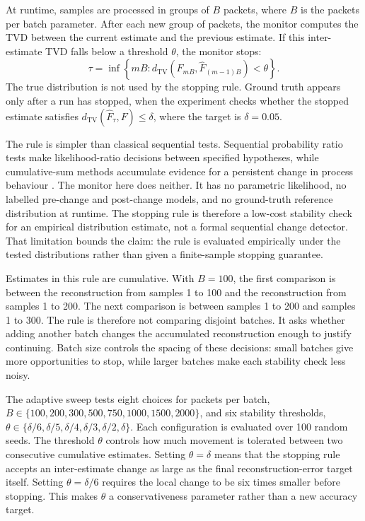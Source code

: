 \documentclass[a4paper,11pt]{report}
\begin{document}
At runtime, samples are processed in groups of \(B\) packets, where \(B\) is the packets per batch parameter. After each new group of packets, the monitor computes the TVD between the current estimate and the previous estimate. If this inter-estimate TVD falls below a threshold \(\theta\), the monitor stops:
\[
\tau = \inf\left\{mB : d_{\mathrm{TV}}\left(\widehat{F}_{mB}, \widehat{F}_{(m-1)B}\right) < \theta\right\}.
\]
The true distribution is not used by the stopping rule. Ground truth appears only after a run has stopped, when the experiment checks whether the stopped estimate satisfies \(d_{\mathrm{TV}}(\widehat{F}_{\tau},F)\leq\delta\), where the target is \(\delta=0.05\).

The rule is simpler than classical sequential tests. Sequential probability ratio tests make likelihood-ratio decisions between specified hypotheses, while cumulative-sum methods accumulate evidence for a persistent change in process behaviour \cite{waldSequential,pageCusum,laiSequential}. The monitor here does neither. It has no parametric likelihood, no labelled pre-change and post-change models, and no ground-truth reference distribution at runtime. The stopping rule is therefore a low-cost stability check for an empirical distribution estimate, not a formal sequential change detector. That limitation bounds the claim: the rule is evaluated empirically under the tested distributions rather than given a finite-sample stopping guarantee.

Estimates in this rule are cumulative. With \(B=100\), the first comparison is between the reconstruction from samples 1 to 100 and the reconstruction from samples 1 to 200. The next comparison is between samples 1 to 200 and samples 1 to 300. The rule is therefore not comparing disjoint batches. It asks whether adding another batch changes the accumulated reconstruction enough to justify continuing. Batch size controls the spacing of these decisions: small batches give more opportunities to stop, while larger batches make each stability check less noisy.

The adaptive sweep tests eight choices for packets per batch,
\(B \in \{100,200,300,500,750,1000,1500,2000\}\), and six stability thresholds, \(\theta \in \{\delta/6,\delta/5,\delta/4,\delta/3,\delta/2,\delta\}\). Each configuration is evaluated over 100 random seeds. The threshold \(\theta\) controls how much movement is tolerated between two consecutive cumulative estimates. Setting \(\theta=\delta\) means that the stopping rule accepts an inter-estimate change as large as the final reconstruction-error target itself. Setting \(\theta=\delta/6\) requires the local change to be six times smaller before stopping. This makes \(\theta\) a conservativeness parameter rather than a new accuracy target.
\end{document}
